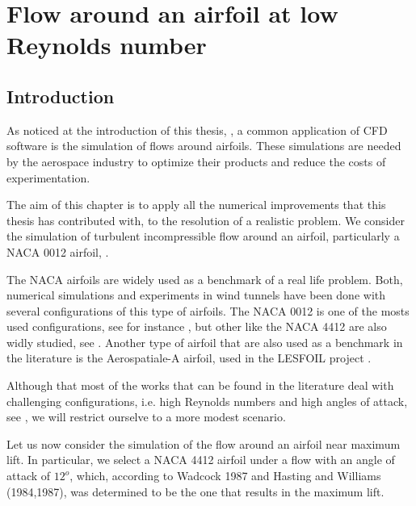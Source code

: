 \chapter{Flow around an airfoil at low Reynolds number}
\label{chap-NACA}

\section{Introduction}
\label{sec-C8_introduction}
As noticed at the introduction of this thesis, , a common application of CFD software is the simulation of flows around airfoils. These simulations are needed by the aerospace industry to optimize their products and reduce the costs of experimentation.

The aim of this chapter is to apply all the numerical improvements that this thesis has contributed with, to the resolution of a realistic problem. We consider the simulation of turbulent incompressible flow around an airfoil, particularly a NACA 0012 airfoil, \cite{NACA}.

The NACA airfoils are widely used as a benchmark of a real life problem. Both, numerical simulations and experiments in wind tunnels have been done with several configurations of this type of airfoils. The NACA 0012 is one of the mosts used configurations, see for instance \cite{Sheldahl,McCroskey,Rivera}, but other like the NACA 4412 are also widly studied, see \cite{Wadcock 1987 and Hasting and Williams (1984,1987)}. Another type of airfoil that are also used as a benchmark in the literature is the Aerospatiale-A airfoil, used in the LESFOIL project \cite{Davidson_2012}.

Although that most of the works that can be found in the literature deal with challenging configurations, i.e. high Reynolds numbers and high angles of attack, see \cite{jansen_stabilized_1999, kaltenbach_large-eddy_1995, schmidt_assessment_????,lesons_from_LESFOIL}, we will restrict ourselve to a more modest scenario.

Let us now consider the simulation of the flow around an airfoil near maximum lift. In particular, we select a NACA 4412 airfoil under a flow with an angle of attack of $12^o$, which, according to Wadcock 1987 and Hasting and Williams (1984,1987), was determined to be the one that results in the maximum lift.

